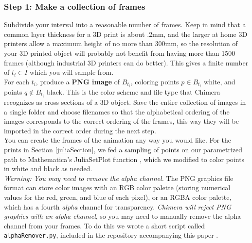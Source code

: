 \documentclass[12 pt]{article}
\begin{document}
\subsubsection*{Step 1: Make a collection of frames}
Subdivide your interval into a reasonable number of frames.  Keep in mind that a common layer thickness for a 3D print is about .2mm, and the larger at home 3D printers allow a maximum height of no more than 300mm, so the resolution of your 3D printed object will probably not benefit from having more than 1500 frames (although industrial 3D printers can do better).  This gives a finite number of $t_i\in I$ which you will sample from.\\

For each $t_i$, produce a \textbf{PNG image} of $B_{t_i}$, coloring points $p\in B_{t_i}$ white, and points $q\notin B_{t_i}$ black.  This is the color scheme and file type that Chimera recognizes as cross sections of a 3D object.  Save the entire collection of images in a single folder and choose filenames so that the alphabetical ordering of the images corresponds to the correct ordering of the frames, this way they will be imported in the correct order during the next step.\\

You can create the frames of the animation any way you would like.  For the prints in Section \ref{juliaSection}, we fed a sampling of points on our parametrized path to Mathematica's JuliaSetPlot function \cite{Mathematica}, which we modified to color points in white and black as needed.\\

\textit{Warning: You may need to remove the alpha channel.}  The PNG graphics file format can store color images with an RGB color palette (storing numerical values for the red, green, and blue of each pixel), or an RGBA color palette, which has a fourth \textit{alpha} channel for transparency.  \textit{Chimera will reject PNG graphics with an alpha channel}, so  you may need to manually remove the alpha channel from your frames.  To do this we wrote a short script called \verb|alphaRemover.py|, included in the repository accompanying this paper \cite{github}.
\end{document}
